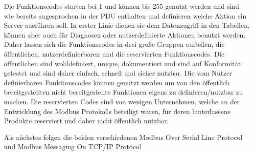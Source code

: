 Die Funktionscodes starten bei 1 und können bis 255 genutzt werden und sind wie bereits angesprochen in der PDU enthalten und definieren welche Aktion ein Server ausführen soll. In erster Linie dienen sie dem Datenzugriff in den Tabellen, können aber auch für Diagnosen oder nutzerdefinierte Aktionen benutzt werden. Daher lassen sich die Funktionscodes in drei große Gruppen aufteilen, die öffentlichen, nutzerdefinierbaren und die reservierten Funktionscodes. Die öffentlichen sind wohldefiniert, unique, dokumentiert und sind auf Konformität getestet und sind daher einfach, schnell und sicher nutzbar. Die vom Nutzer definierbaren Funktionscodes können genutzt werden um von den öffentlich bereitgestellten nicht bereitgestellte Funktionen eigens zu definieren/nutzbar zu machen. Die reservierten Codes sind von wenigen Unternehmen, welche an der Entwicklung des Modbus Protokolls beteiligt waren, für deren hinterlassene Produkte reserviert und daher nicht öffentlich nutzbar\cite[S.~10ff.]{mod12}.

Als nächstes folgen die beiden verschiedenen Modbus Over Serial Line Protocol und Modbus Messaging On TCP/IP Protocol

